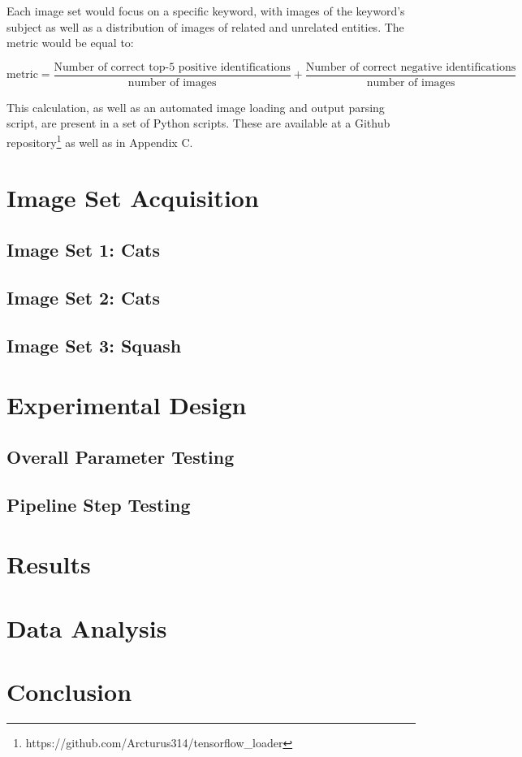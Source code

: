 \documentclass{report}
\begin{document}
		Each image set would focus on a specific keyword, with images of the keyword's subject as well as a distribution of images of related and unrelated entities. The metric would be equal to:
		
		\begin{equation*}
			\text{metric}=\frac{\text{Number of correct top-5 positive identifications}}{\text{number of images}} + \frac{\text{Number of correct negative identifications}}{\text{number of images}}
		\end{equation*}
		
		This calculation, as well as an automated image loading and output parsing script, are present in a set of Python scripts. These are available at a Github repository\footnote{https://github.com/Arcturus314/tensorflow\_loader} as well as in Appendix C.
	\section{Image Set Acquisition}
		\subsection{Image Set 1: Cats}
		\subsection{Image Set 2: Cats}
		\subsection{Image Set 3: Squash}
	\section{Experimental Design}
		\subsection{Overall Parameter Testing}
		\subsection{Pipeline Step Testing}
	\section{Results}
	\section{Data Analysis}
	\section{Conclusion}
\end{document}
